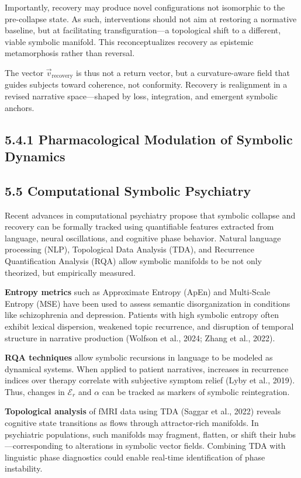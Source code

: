 Importantly, recovery may produce novel configurations not isomorphic to the pre-collapse state. As such, interventions should not aim at restoring a normative baseline, but at facilitating transfiguration—a topological shift to a different, viable symbolic manifold. This reconceptualizes recovery as epistemic metamorphosis rather than reversal.

The vector $\vec{v}_{\text{recovery}}$ is thus not a return vector, but a curvature-aware field that guides subjects toward coherence, not conformity. Recovery is realignment in a revised narrative space—shaped by loss, integration, and emergent symbolic anchors.
 

\subsection*{5.4.1 Pharmacological Modulation of Symbolic Dynamics}
 
\subsection*{5.5 Computational Symbolic Psychiatry}

Recent advances in computational psychiatry propose that symbolic collapse and recovery can be formally tracked using quantifiable features extracted from language, neural oscillations, and cognitive phase behavior. Natural language processing (NLP), Topological Data Analysis (TDA), and Recurrence Quantification Analysis (RQA) allow symbolic manifolds to be not only theorized, but empirically measured.

\textbf{Entropy metrics} such as Approximate Entropy (ApEn) and Multi-Scale Entropy (MSE) have been used to assess semantic disorganization in conditions like schizophrenia and depression. Patients with high symbolic entropy often exhibit lexical dispersion, weakened topic recurrence, and disruption of temporal structure in narrative production (Wolfson et al., 2024; Zhang et al., 2022)\cite{Wolfson2024, Zhang2022}. 

\textbf{RQA techniques} allow symbolic recursions in language to be modeled as dynamical systems. When applied to patient narratives, increases in recurrence indices over therapy correlate with subjective symptom relief (Lyby et al., 2019)\cite{Lyby2019}. Thus, changes in $\mathcal{E}_r$ and $\alpha$ can be tracked as markers of symbolic reintegration.

\textbf{Topological analysis} of fMRI data using TDA (Saggar et al., 2022)\cite{Saggar2022} reveals cognitive state transitions as flows through attractor-rich manifolds. In psychiatric populations, such manifolds may fragment, flatten, or shift their hubs—corresponding to alterations in symbolic vector fields. Combining TDA with linguistic phase diagnostics could enable real-time identification of phase instability.

